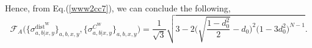 \documentclass[reprint,superscriptaddress,nofootinbib,amsmath,amssymb,aps,pra,longbibliography]{revtex4-1}
\begin{document}
\begin{widetext}
Hence, from Eq.(\ref{www2cc7}), we can conclude the following,
 \begin{equation}
		\mathcal{F}_A \Big(\{\sigma_{a,b|x,y}^{\text{dist}^{\text{W}}}\}_{a,b,x,y}, \{\sigma_{a,b|x,y}^{C^{\text{W}}}\}_{a,b,x,y} \Big) = \dfrac{1}{\sqrt{3}}\sqrt{3 - 2 \Bigg(\sqrt{\frac{1-d_0^2}{2}} - d_0 \Bigg)^2 \Big(1-3d_0^2 \Big)^{N-1}}.
	\end{equation}














\end{widetext}
\end{document}
